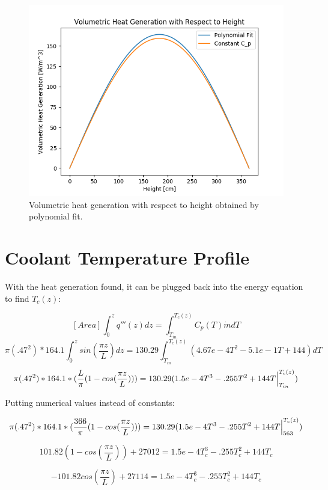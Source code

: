 \documentclass[12pt,letterpaper]{article}
\begin{document}
\begin{figure}[htbp!]
    \begin{center}
        \includegraphics[scale=0.7]{q_vol_z.png}
    \end{center}
    \caption{Volumetric heat generation with respect to height obtained by polynomial fit.}
    \label{fig:q_vol}
\end{figure}




\section*{Coolant Temperature Profile}
With the heat generation found, it can be plugged back
into the energy equation to find $T_c(z)$:

\[[Area] \int^{z}_0 q'''(z) dz = \int^{T_c (z)}_{T_{in}} C_p(T) \dot{m} dT\]
\[\pi (.47^2) * 164.1 \int^{z}_0 sin(\frac{\pi z}{L})  dz =
    130.29 \int^{T_c (z)}_{T_{in}} (4.67e-4T^2 -5.1e-1T + 144)  dT\]
\[\pi (.47^2) * 164.1 * (\frac{L}{\pi} (1-cos(\frac{\pi z}{L}))) =
    130.29 (1.5e-4T^3 - .255T^2 + 144 T \Big{|}^{T_c (z)}_{T_{in}})\]

Putting numerical values instead of constants:

\[\pi (.47^2) * 164.1 * (\frac{366}{\pi} (1-cos(\frac{\pi z}{L}))) =
    130.29 (1.5e-4T^3 - .255T^2 + 144 T \Big{|}^{T_c (z)}_{563})\]

\[101.82 (1- cos(\frac{\pi z}{L})) + 27012 = 1.5e-4T_c^3 - .255T_c^2 + 144 T_c \]

\[-101.82 cos(\frac{\pi z}{L}) + 27114 = 1.5e-4T_c^3 - .255T_c^2 + 144 T_c \]
\end{document}
